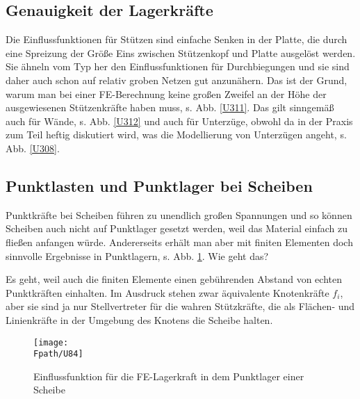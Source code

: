 {{{{%
{\textcolor{sectionTitleBlue}{\section{Genauigkeit der Lagerkr\"{a}fte}}
Die Einflussfunktionen f\"{u}r St\"{u}tzen sind einfache Senken in der Platte, die durch eine Spreizung der Gr\"{o}{\ss}e Eins zwischen St\"{u}tzenkopf und Platte ausgel\"{o}st werden. Sie \"{a}hneln vom Typ her den Einflussfunktionen f\"{u}r Durchbie\-gungen und sie sind daher auch schon auf relativ groben Netzen gut anzun\"{a}hern. Das ist der Grund, warum man bei einer FE-Berechnung keine gro{\ss}en Zweifel an der H\"{o}he der ausgewiesenen St\"{u}tzenkr\"{a}fte haben muss, s. Abb. \ref{U311}. Das gilt sinngem\"{a}{\ss} auch f\"{u}r W\"{a}nde, s. Abb. \ref{U312} und auch f\"{u}r Unterz\"{u}ge, obwohl da in der Praxis zum Teil heftig diskutiert wird, was die Modellierung von Unterz\"{u}gen angeht, s. Abb. \ref{U308}.

{\textcolor{sectionTitleBlue}{\section{Punktlasten und Punktlager bei Scheiben}}
Punktkr\"{a}fte bei Scheiben f\"{u}hren zu unendlich gro{\ss}en Spannungen und so k\"{o}nnen Scheiben auch nicht auf Punktlager gesetzt werden, weil das Material einfach zu flie{\ss}en anfangen w\"{u}rde. Andererseits erh\"{a}lt man aber mit finiten Elementen doch sinnvolle Ergebnisse in Punktlagern, s. Abb. \ref{U84}. Wie geht das?

Es geht, weil auch die finiten Elemente einen geb\"{u}hrenden Abstand von echten Punktkr\"{a}ften einhalten. Im Ausdruck stehen zwar \"{a}quivalente Knotenkr\"{a}fte $f_i$, aber sie sind ja nur Stellvertreter f\"{u}r die wahren St\"{u}tzkr\"{a}fte, die als Fl\"{a}chen- und Linienkr\"{a}fte in der Umgebung des Knotens die Scheibe halten.
\begin{figure}[tbp]
\centering
\texttt{[image: \\Fpath/U84]}
\caption{Einflussfunktion f\"{u}r die FE-Lagerkraft in dem Punktlager einer Scheibe} \label{U84}
\end{figure}%

}}}}}}
